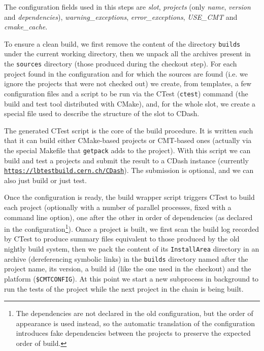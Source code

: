 \documentclass{lhcbnote}
\newcommand{\link}[2]{\href{#1}{#2}}
\newcommand{\urlLink}[1]{\link{#1}{\texttt{#1}}}
\begin{document}
The configuration fields used in this steps are \emph{slot}, \emph{projects}
(only \emph{name}, \emph{version} and \emph{dependencies}),
\emph{warning\_exceptions}, \emph{error\_exceptions}, \emph{USE\_CMT} and
\emph{cmake\_cache}.

To ensure a clean build, we first remove the content of the directory
\texttt{builds} under the current working directory, then we unpack all the
archives present in the \texttt{sources} directory (those produced during the
checkout step).  For each project found in the configuration and for which the
sources are found (i.e. we ignore the projects that were not checked out) we
create, from templates, a few configuration files and a script to be run via the
CTest\cite{CMake} (\texttt{ctest}) command (the build and test tool distributed
with CMake), and, for the whole slot, we create a special file used to describe
the structure of the slot to CDash\cite{CDashSubprojects}.

The generated CTest script is the core of the build procedure.  It is written
such that it can build either CMake-based projects or CMT-based\cite{CMT} ones
(actually via the special Makefile that \texttt{getpack} adds to the project).
With this script we can build and test a projects and submit the result to a
CDash instance (currently \urlLink{https://lbtestbuild.cern.ch/CDash}). The
submission is optional, and we can also just build or just test.

Once the configuration is ready, the build wrapper script triggers CTest to
build each project (optionally with a number of parallel processes, fixed with a
command line option), one after the other in order of dependencies (as declared
in the configuration\footnote{The dependencies are not declared in the old
configuration, but the order of appearance is used instead, so the automatic
translation of the configuration introduces fake dependencies between the
projects to preserve the expected order of build.}).  Once a project is built,
we first scan the build log recorded by CTest to produce summary files
equivalent to those produced by the old nightly build system, then we pack the
content of its \texttt{InstallArea} directory in an archive (dereferencing
symbolic links) in the \texttt{builds} directory named after the project name,
its version, a build id (like the one used in the checkout) and the platform
(\texttt{\$CMTCONFIG}).  At this point we start a new subprocess in background
to run the tests of the project while the next project in the chain is being
built.
\end{document}
